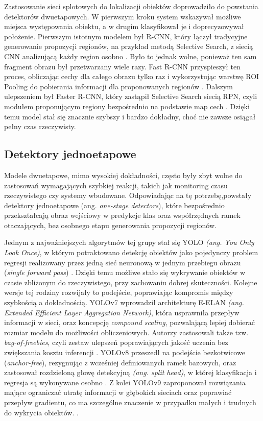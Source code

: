 Zastosowanie sieci splotowych do lokalizacji obiektów doprowadziło do powstania detektorów
dwuetapowych. W pierwszym kroku system wskazywał możliwe miejsca występowania obiektu, a w drugim
klasyfikował je i doprecyzowywał położenie. Pierwszym istotnym modelem był R-CNN, który łączył
tradycyjne generowanie propozycji regionów, na przykład metodą Selective Search, z siecią CNN
analizującą każdy region osobno \cite{girshick2014rich}. Było to jednak wolne, ponieważ ten sam
fragment obrazu był przetwarzany wiele razy. Fast R-CNN przyspieszył ten proces, obliczając cechy
dla całego obrazu tylko raz i wykorzystując warstwę ROI Pooling do pobierania informacji dla
proponowanych regionów \cite{girshick2015fast}. Dalszym ulepszeniem był Faster R-CNN, który
zastąpił Selective Search siecią RPN, czyli modułem proponującym regiony bezpośrednio na podstawie
map cech \cite{ren2015faster}. Dzięki temu model stał się znacznie szybszy i bardzo dokładny, choć
nie zawsze osiągał pełny czas rzeczywisty.

\subsection{Detektory jednoetapowe}

Modele dwuetapowe, mimo wysokiej dokładności, często były zbyt wolne do zastosowań wymagających
szybkiej reakcji, takich jak monitoring czasu rzeczywistego czy systemy wbudowane. Odpowiadając na
tę potrzebę,powstały detektory jednoetapowe (ang. \textit{one-stage detectors}), które bezpośrednio
przekształcają obraz wejściowy w predykcje klas oraz współrzędnych ramek otaczających, bez osobnego
etapu generowania propozycji regionów.

Jednym z najważniejszych algorytmów tej grupy stał się YOLO \textit{(ang. You Only Look Once)}, w
którym potraktowano detekcję obiektów jako pojedynczy problem regresji realizowany przez jedną sieć
neuronową w jednym przebiegu obrazu (\textit{single forward pass}) \cite{redmon2016yolo}. Dzięki
temu możliwe stało się wykrywanie obiektów w czasie zbliżonym do rzeczywistego, przy zachowaniu
dobrej skuteczności. Kolejne wersje tej rodziny rozwijały to podejście, poprawiając kompromis
między szybkością a dokładnością. YOLOv7 wprowadził architekturę E-ELAN \textit{(ang. Extended
  Efficient Layer Aggregation Network)}, która usprawniła przepływ informacji w sieci, oraz koncepcję
\textit{compound scaling}, pozwalającą lepiej dobierać rozmiar modelu do możliwości obliczeniowych.
Autorzy zastosowali także tzw. \textit{bag-of-freebies}, czyli zestaw ulepszeń poprawiających
jakość uczenia bez zwiększania kosztu inferencji \cite{wang2023yolov7}. YOLOv8 przeszedł na
podejście bezkotwicowe (\textit{anchor-free}), rezygnując z wcześniej definiowanych ramek bazowych,
oraz zastosował rozdzieloną głowę detekcyjną \textit{(ang. split head)}, w której klasyfikacja i
regresja są wykonywane osobno \cite{ultralytics2023yolov8}. Z kolei YOLOv9 zaproponował rozwiązania
mające ograniczać utratę informacji w głębokich sieciach oraz poprawiać przepływ gradientu, co ma
szczególne znaczenie w przypadku małych i trudnych do wykrycia obiektów. \cite{wang2024yolov9}.

